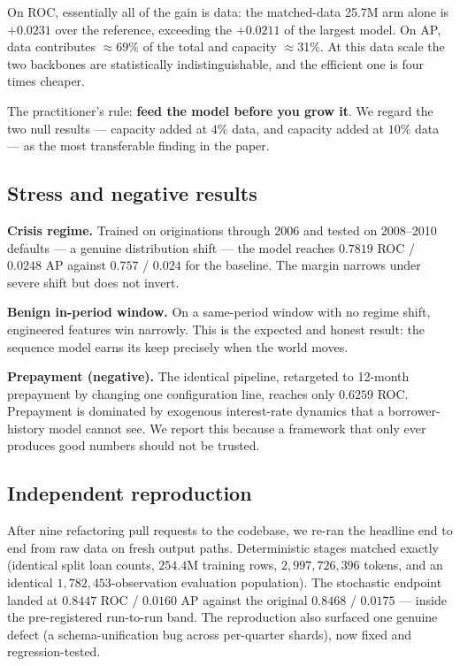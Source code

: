\documentclass[10pt,letterpaper]{article}
\begin{document}
On ROC, essentially all of the gain is data: the matched-data 25.7M arm alone is $+0.0231$ over the
reference, exceeding the $+0.0211$ of the largest model. On AP, data contributes $\approx$69\% of the
total and capacity $\approx$31\%. At this data scale the two backbones are statistically
indistinguishable, and the efficient one is four times cheaper.

The practitioner's rule: \textbf{feed the model before you grow it}. We regard the two null results
--- capacity added at $4\%$ data, and capacity added at $10\%$ data --- as the most transferable
finding in the paper.

\subsection{Stress and negative results}
\label{sec:stress}
\textbf{Crisis regime.} Trained on originations through 2006 and tested on 2008--2010 defaults ---
a genuine distribution shift --- the model reaches $0.7819$ ROC / $0.0248$ AP against
$0.757$ / $0.024$ for the baseline. The margin narrows under severe shift but does not invert.

\textbf{Benign in-period window.} On a same-period window with no regime shift, engineered features
win narrowly. This is the expected and honest result: the sequence model earns its keep precisely
when the world moves.

\textbf{Prepayment (negative).} The identical pipeline, retargeted to 12-month prepayment by
changing one configuration line, reaches only $0.6259$ ROC. Prepayment is dominated by exogenous
interest-rate dynamics that a borrower-history model cannot see. We report this because a framework
that only ever produces good numbers should not be trusted.

\subsection{Independent reproduction}
\label{sec:repro}
After nine refactoring pull requests to the codebase, we re-ran the headline end to end from raw
data on fresh output paths. Deterministic stages matched exactly (identical split loan counts,
$254.4$M training rows, $2{,}997{,}726{,}396$ tokens, and an identical $1{,}782{,}453$-observation
evaluation population). The stochastic endpoint landed at $0.8447$ ROC / $0.0160$ AP against the
original $0.8468$ / $0.0175$ --- inside the pre-registered run-to-run band. The reproduction also
surfaced one genuine defect (a schema-unification bug across per-quarter shards), now fixed and
regression-tested.
\end{document}
